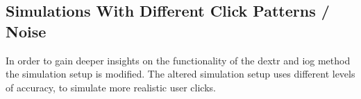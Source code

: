 \subsection{Simulations With Different Click Patterns / Noise}\label{ord:ch5:sec3:subsec3}



In order to gain deeper insights on the functionality of the \gls{dextr} and \gls{iog} method the simulation setup is modified.
The altered simulation setup uses different levels of accuracy, to simulate more realistic user clicks.

